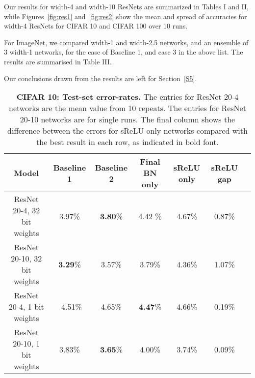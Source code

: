 \documentclass[conference]{IEEEtran}
\begin{document}
Our results for width-4 and width-10 ResNets are summarized in Tables I and II, while Figures~\ref{fig:res1} and~\ref{fig:res2} show the mean and spread of accuracies for width-4 ResNets for CIFAR 10 and CIFAR 100 over 10 runs. 

For ImageNet, we compared width-1 and width-2.5 networks, and an ensemble of 3 width-1 networks, for the case of Baseline 1, and case 3 in the above list. The results are summarised in Table III.

Our conclusions drawn from the results are left for Section~\ref{S5}.




\begin{table*}[h]
\caption{{\bf CIFAR 10: Test-set error-rates.} The entries for ResNet 20-4 networks are the mean value from 10 repeats. The entries for ResNet 20-10 networks are for single runs. The final column shows the difference between the errors for sReLU only networks compared with the best result in each row, as indicated in bold font.} \label{Table00}
\begin{center}
\footnotesize
\begin{tabular}{|c|c|c|c|c|c|c}
\hline
{\bf Model} &{\bf Baseline 1} & {\bf Baseline 2} & {\bf Final BN only} & {\bf sReLU only} &{\bf sReLU gap}\\
\hline
ResNet 20-4, 32 bit weights & {3.97}\%& {\bf 3.80}\% &4.42 \% & 4.67\% & 0.87\%\\
\hline
ResNet 20-10, 32 bit weights & {\bf 3.29}\%&3.57\% &3.79\% & 4.36\%& 1.07\%\\
\hline
\hline
ResNet 20-4, 1 bit weights & {\ 4.51}\%& 4.65\%&{\bf 4.47}\% &4.66\% & 0.19\%\\
\hline
ResNet 20-10, 1 bit weights &3.83\% & {\bf 3.65}\%&4.00\% & 3.74\%& 0.09\%\\
\hline
\end{tabular}
\end{center}
\end{table*}
\end{document}
